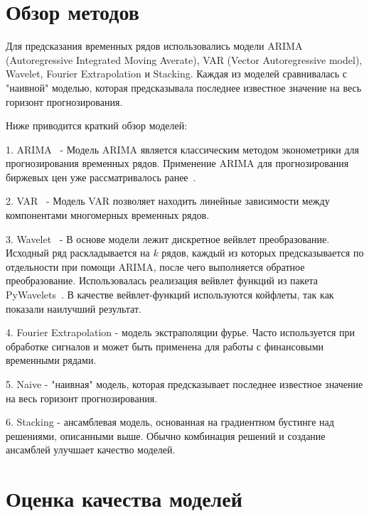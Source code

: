 \documentclass[a4paper,article,14pt]{extarticle}
\begin{document}
\pagebreak

\section{Обзор методов}

Для предсказания временных рядов использовались модели ARIMA (Autoregressive Integrated Moving Averate), VAR (Vector Autoregressive model), Wavelet, Fourier Extrapolation и Stacking.
Каждая из моделей сравнивалась с "наивной" моделью, которая предсказывала последнее известное значение на весь горизонт прогнозирования.

\par
Ниже приводится краткий обзор моделей:

1.
ARIMA~\cite{arima} - Модель ARIMA является классическим методом эконометрики для прогнозирования временных рядов.
Применение ARIMA для прогнозирования биржевых цен уже рассматривалось ранее~\cite{my_arima_article}.


2.
VAR~\cite{var} - Модель VAR позволяет находить линейные зависимости между компонентами многомерных временных рядов.


3.
Wavelet~\cite{wavelet} - В основе модели лежит дискретное вейвлет преобразование.
Исходный ряд раскладывается на $k$ рядов, каждый из которых предсказывается по отдельности при помощи ARIMA, после чего выполняется обратное преобразование.
Использовалась реализация вейвлет функций из пакета PyWavelets~\cite{pywt}.
В качестве вейвлет-функций используются койфлеты, так как показали наилучший результат.

4.
Fourier Extrapolation - модель экстраполяции фурье.
Часто используется при обработке сигналов и может быть применена для работы с финансовыми временными рядами.


5.
Naive - "наивная" модель, которая предсказывает последнее известное значение на весь горизонт прогнозирования.

6.
Stacking - ансамблевая модель, основанная на градиентном бустинге над решениями, описанными выше.
Обычно комбинация решений и создание ансамблей улучшает качество моделей.


\section{Оценка качества моделей}
\end{document}
